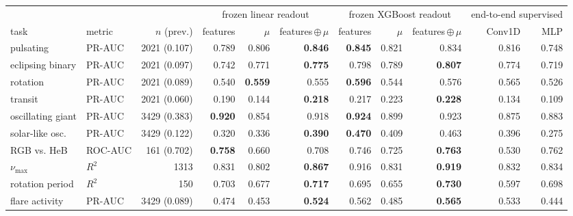 \setlength{\tabcolsep}{3pt}
\begin{tabular}{llrrrrrrrrr}
\toprule
 & & & \multicolumn{3}{c}{frozen linear readout} & \multicolumn{3}{c}{frozen XGBoost readout} & \multicolumn{2}{c}{end-to-end supervised} \\
\cmidrule(lr){4-6}\cmidrule(lr){7-9}\cmidrule(lr){10-11}
task & metric & $n$ (prev.) & features & $\mu$ & features\,$\oplus$\,$\mu$ & features & $\mu$ & features\,$\oplus$\,$\mu$ & Conv1D & MLP \\
\midrule
pulsating & PR-AUC & 2021 (0.107) & 0.789 & 0.806 & \textbf{0.846} & \textbf{0.845} & 0.821 & 0.834 & 0.816 & 0.748 \\
eclipsing binary & PR-AUC & 2021 (0.097) & 0.742 & 0.771 & \textbf{0.775} & 0.798 & 0.789 & \textbf{0.807} & 0.774 & 0.719 \\
rotation & PR-AUC & 2021 (0.089) & 0.540 & \textbf{0.559} & 0.555 & \textbf{0.596} & 0.544 & 0.576 & 0.565 & 0.526 \\
transit & PR-AUC & 2021 (0.060) & 0.190 & 0.144 & \textbf{0.218} & 0.217 & 0.223 & \textbf{0.228} & 0.134 & 0.109 \\
oscillating giant & PR-AUC & 3429 (0.383) & \textbf{0.920} & 0.854 & 0.918 & \textbf{0.924} & 0.899 & 0.923 & 0.875 & 0.883 \\
solar-like osc. & PR-AUC & 3429 (0.122) & 0.320 & 0.336 & \textbf{0.390} & \textbf{0.470} & 0.409 & 0.463 & 0.396 & 0.275 \\
RGB vs. HeB & ROC-AUC & 161 (0.702) & \textbf{0.758} & 0.660 & 0.708 & 0.746 & 0.725 & \textbf{0.763} & 0.530 & 0.762 \\
$\nu_{\max}$ & $R^2$ & 1313 & 0.831 & 0.802 & \textbf{0.867} & 0.916 & 0.831 & \textbf{0.919} & 0.832 & 0.834 \\
rotation period & $R^2$ & 150 & 0.703 & 0.677 & \textbf{0.717} & 0.695 & 0.655 & \textbf{0.730} & 0.597 & 0.698 \\
flare activity & PR-AUC & 3429 (0.089) & 0.474 & 0.453 & \textbf{0.524} & 0.562 & 0.485 & \textbf{0.565} & 0.533 & 0.444 \\
\bottomrule
\end{tabular}

